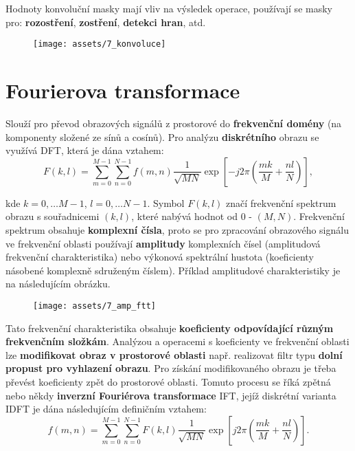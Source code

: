 Hodnoty konvoluční masky mají vliv na výsledek operace, používají se masky pro: \textbf{rozostření}, \textbf{zostření}, \textbf{detekci hran}, atd.

\begin{figure}[H]
    \centering
    \texttt{[image: assets/7\_konvoluce]}
\end{figure}

\section{Fourierova transformace}
Slouží pro převod obrazových signálů z prostorové do \textbf{frekvenční domény} (na komponenty složené ze sínů a cosínů). Pro analýzu \textbf{diskrétního} obrazu se využívá DFT, která je dána vztahem:
\begin{equation*}
    F(k, l) = \sum_{m = 0}^{M - 1}\sum_{n = 0}^{N - 1} f(m, n) \frac{1}{\sqrt{MN}} \exp \left[ -j2\pi \left( \frac{mk}{M} + \frac{nl}{N} \right) \right],
\end{equation*}

kde $k = 0, \ldots M - 1$, $l = 0, \ldots N - 1$. Symbol $F(k, l)$ značí frekvenční spektrum obrazu s souřadnicemi $(k, l)$, které nabývá hodnot od 0 - $(M, N)$. Frekvenční spektrum obsahuje \textbf{komplexní čísla}, proto se pro zpracování obrazového signálu ve frekvenční oblasti používají \textbf{amplitudy} komplexních čísel (amplitudová frekvenční charakteristika) nebo výkonová spektrální hustota (koeficienty násobené komplexně sdruženým číslem). Příklad amplitudové charakteristiky je na následujícím obrázku.

\begin{figure}[H]
    \centering
    \texttt{[image: assets/7\_amp\_ftt]}
\end{figure}

Tato frekvenční charakteristika obsahuje \textbf{koeficienty odpovídající různým frekvenčním složkám}. Analýzou a operacemi s koeficienty ve frekvenční oblasti lze \textbf{modifikovat obraz v prostorové oblasti} např. realizovat filtr typu \textbf{dolní propust pro vyhlazení obrazu}. Pro získání modifikovaného obrazu je třeba převést koeficienty zpět do prostorové oblasti. Tomuto procesu se říká zpětná nebo někdy \textbf{inverzní Fouriérova transformace} IFT, jejíž diskrétní varianta IDFT je dána následujícím definičním vztahem:
\begin{equation*}
    f(m, n) = \sum_{m = 0}^{M - 1}\sum_{n = 0}^{N - 1} F(k, l) \frac{1}{\sqrt{MN}} \exp \left[ j2\pi \left( \frac{mk}{M} + \frac{nl}{N} \right) \right].
\end{equation*}


